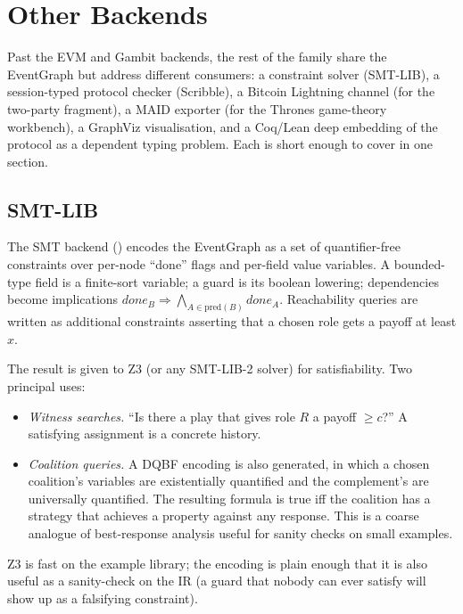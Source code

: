 \section{Other Backends}
\label{sec:other-backends}

Past the EVM and Gambit backends, the rest of the family share the
EventGraph but address different consumers: a constraint solver
(SMT-LIB), a session-typed protocol checker (Scribble), a Bitcoin
Lightning channel (for the two-party fragment), a MAID exporter
(for the Thrones game-theory workbench), a GraphViz visualisation,
and a Coq/Lean deep embedding of the protocol as a dependent
typing problem.  Each is short enough to cover in one section.

\subsection{SMT-LIB}

The SMT backend () encodes the EventGraph
as a set of quantifier-free constraints over per-node ``done''
flags and per-field value variables.  A bounded-type field is a
finite-sort variable; a guard is its boolean lowering;
dependencies become implications
\(\mathit{done}_B \Rightarrow \bigwedge_{A \in \mathrm{pred}(B)} \mathit{done}_A\).
Reachability queries are written as additional constraints
asserting that a chosen role gets a payoff at least $x$.

The result is given to Z3 (or any SMT-LIB-2 solver) for
satisfiability.  Two principal uses:

\begin{itemize}\itemsep1pt
\item \emph{Witness searches.}  ``Is there a play that gives role
  $R$ a payoff $\geq c$?''  A satisfying assignment is a concrete
  history.
\item \emph{Coalition queries.}  A DQBF encoding is also generated,
  in which a chosen coalition's variables are existentially
  quantified and the complement's are universally quantified.  The
  resulting formula is true iff the coalition has a strategy that
  achieves a property against any response.  This is a coarse
  analogue of best-response analysis useful for sanity checks on
  small examples.
\end{itemize}

Z3 is fast on the example library; the encoding is plain enough
that it is also useful as a sanity-check on the IR (a guard that
nobody can ever satisfy will show up as a falsifying constraint).

